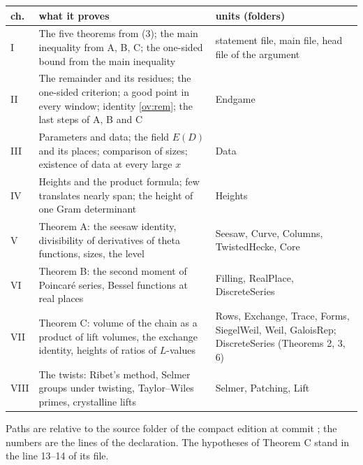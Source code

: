{\small\setlength{\tabcolsep}{4pt}\noindent
\begin{tabular}{@{}>{\raggedright\arraybackslash}p{8mm}>{\raggedright\arraybackslash}p{90mm}>{\raggedright\arraybackslash}p{46mm}@{}}
\toprule\textbf{ch.} & \textbf{what it proves} & \textbf{units (folders)}\\\midrule
I & The five theorems from (3); the main inequality from A, B, C; the one-sided bound from the main inequality &
  statement file, main file, head file of the argument\\
II & The remainder and its residues; the one-sided criterion; a good point in every window; identity
  \eqref{ov:rem}; the last steps of A, B and C & Endgame\\
III & Parameters and data; the field $E(D)$ and its places; comparison of sizes; existence of data at every large
  $x$ & Data\\
IV & Heights and the product formula; few translates nearly span; the height of one Gram determinant & Heights\\
V & Theorem A: the seesaw identity, divisibility of derivatives of theta functions, sizes, the level & Seesaw, Curve,
  Columns, TwistedHecke, Core\\
VI & Theorem B: the second moment of Poincaré series, Bessel functions at real places & Filling, RealPlace,
  DiscreteSeries\\
VII & Theorem C: volume of the chain as a product of lift volumes, the exchange identity, heights of ratios of
  $L$-values & Rows, Exchange, Trace, Forms, SiegelWeil, Weil, GaloisRep; DiscreteSeries (Theorems 2, 3, 6)\\
VIII & The twists: Ribet's method, Selmer groups under twisting, Taylor--Wiles primes, crystalline lifts & Selmer,
  Patching, Lift\\
\bottomrule
\end{tabular}\par}

 Paths are relative to the source folder of the compact edition at commit
\code{\PinShort}; the numbers are the lines of the declaration. The hypotheses of Theorem C stand in the
 line 13--14 of its file.

